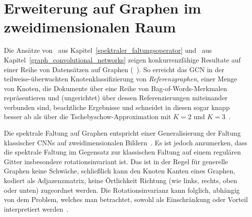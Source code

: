 \section{Erweiterung auf Graphen im zweidimensionalen Raum}
\label{gcn_erweiterung}

Die Ansätze von~\citeauthor{Defferrard} aus Kapitel~\ref{spektraler_faltungsoperator} und~\citeauthor{gcn} aus Kapitel~\ref{graph_convolutional_networks} zeigen konkurrenzfähige Resultate auf einer Reihe von Datensätzen auf Graphen (\vgl{}~\cite{Defferrard, gcn}).
So erreicht das \gls{GCN} \zB{} in der teilweise-überwachten Knotenklassifizierung von \emph{Referenzgraphen}, \dhe{} einer Menge von Knoten, die Dokumente über eine Reihe von Bag-of-Words-Merkmalen repräsentieren und (ungerichtet) über dessen Referenzierungen miteinander verbunden sind, beachtliche Ergebnisse und schneidet in diesen sogar knapp besser ab als über die Tschebyschow-Approximation mit $K=2$ und $K=3$~\cite{gcn}.

Die spektrale Faltung auf Graphen entspricht einer Generalisierung der Faltung klassischer \glspl{CNN} auf zweidimensionalen Bildern~\cite{gcn_review}.
Es ist jedoch anzumerken, dass die spektrale Faltung im Gegensatz zur klassischen Faltung auf einem regulären Gitter insbesondere rotationsinvariant ist.
Das ist in der Regel für generelle Graphen keine Schwäche, schließlich kann den Knoten \bzw{} Kanten eines Graphen, kodiert als Adjazenzmatrix, keine Örtlichkeit \bzw{} Richtung (wie links, rechts, oben oder unten) zugeordnet werden.
Die Rotationsinvarianz kann folglich, abhängig von dem Problem, welches man betrachtet, sowohl als Einschränkung oder Vorteil interpretiert werden~\cite{Defferrard}.



